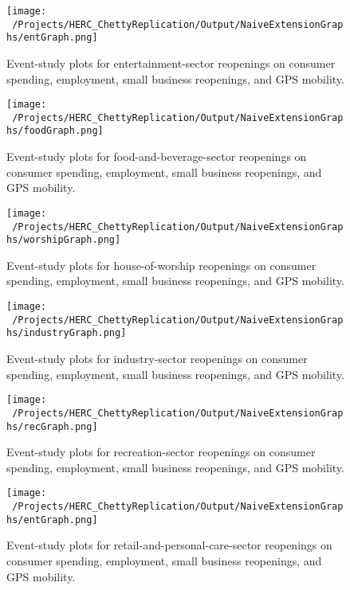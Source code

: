 \documentclass[12pt,letterpaper]{article}
\begin{document}
  \begin{figure}[htb]
    \centering
    \texttt{[image: ~/Projects/HERC\_ChettyReplication/Output/NaiveExtensionGraphs/entGraph.png]}
    \caption{Event-study plots for entertainment-sector reopenings on consumer spending, employment, small business reopenings, and GPS mobility.}
    \label{fig:entGraph}
  \end{figure}
  \begin{figure}[htb]
    \centering
    \texttt{[image: ~/Projects/HERC\_ChettyReplication/Output/NaiveExtensionGraphs/foodGraph.png]}
    \caption{Event-study plots for food-and-beverage-sector reopenings on consumer spending, employment, small business reopenings, and GPS mobility.}
    \label{fig:foodGraph}
  \end{figure}
  \begin{figure}[htb]
    \centering
    \texttt{[image: ~/Projects/HERC\_ChettyReplication/Output/NaiveExtensionGraphs/worshipGraph.png]}
    \caption{Event-study plots for house-of-worship reopenings on consumer spending, employment, small business reopenings, and GPS mobility.}
    \label{fig:worshipGraph}
  \end{figure}
  \begin{figure}[htb]
    \centering
    \texttt{[image: ~/Projects/HERC\_ChettyReplication/Output/NaiveExtensionGraphs/industryGraph.png]}
    \caption{Event-study plots for industry-sector reopenings on consumer spending, employment, small business reopenings, and GPS mobility.}
    \label{fig:industryGraph}
  \end{figure}
  \begin{figure}[htb]
    \centering
    \texttt{[image: ~/Projects/HERC\_ChettyReplication/Output/NaiveExtensionGraphs/recGraph.png]}
    \caption{Event-study plots for recreation-sector reopenings on consumer spending, employment, small business reopenings, and GPS mobility.}
    \label{fig:recGraph}
  \end{figure}
  \begin{figure}[htb]
    \centering
    \texttt{[image: ~/Projects/HERC\_ChettyReplication/Output/NaiveExtensionGraphs/entGraph.png]}
    \caption{Event-study plots for retail-and-personal-care-sector reopenings on consumer spending, employment, small business reopenings, and GPS mobility.}
    \label{fig:retGraph}
  \end{figure}
\end{document}
